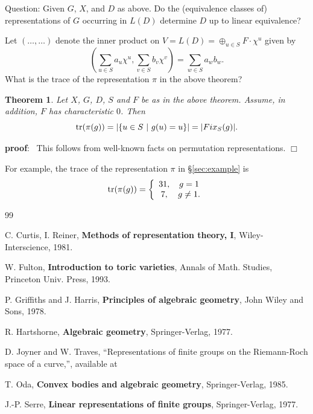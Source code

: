 \documentclass[12pt]{article}
\newtheorem{theorem}{Theorem}
\def\pf{{\bf proof}:\ }
\def\qed{$\Box$}
\begin{document}
Question: Given $G$, $X$, and $D$ as above. Do the
(equivalence classes of) representations of $G$
occurring in $L(D)$ determine $D$ up to linear equivalence?

Let $(\dots ,\dots )$ denote the inner product
on $V=L(D)=\oplus_{u\in S} F\cdot \chi^u$
given by
\[
(\sum_{u\in S}a_u\chi^u,\sum_{v\in S}b_v\chi^v)=
\sum_{w\in S}a_wb_w.
\]
What is the trace of the representation $\pi$ in 
the above theorem?

\begin{theorem}
Let $X$, $G$, $D$, $S$ and $F$ be as in the above theorem.
Assume, in addition, $F$ has characteristic $0$.
Then 
\[
{\rm tr}(\pi(g))=|\{u\in S\ |\ g(u)=u\}|=|Fix_S(g)|.
\]
\end{theorem}

\pf
This follows from well-known facts on permutation representations.
\qed

For example, the trace of the representation $\pi$ in 
\S \ref{sec:example} is 
\[
{\rm tr}(\pi(g))=
\left\{
\begin{array}{cc}
31, & g=1\\
7, & g\not= 1.
\end{array}
\right.
\]



\begin{thebibliography}{99}  

 C. Curtis, I. Reiner, {\bf Methods of 
representation theory, I}, Wiley-Interscience, 1981.
 
 W. Fulton, {\bf Introduction to toric varieties},
Annals of Math. Studies, Princeton Univ. Press, 1993.

 P. Griffiths and J. Harris, 
{\bf Principles of algebraic geometry}, John Wiley and Sons,
1978.

 R. Hartshorne, {\bf Algebraic geometry},
Springer-Verlag, 1977.

 D. Joyner and W. Traves, 
``Representations of finite groups on the Riemann-Roch
space of a curve,'', available at
\newline
\verb++

 T. Oda, {\bf Convex bodies and algebraic geometry},
Springer-Verlag, 1985.

 J.-P. Serre, {\bf Linear representations of 
finite groups}, Springer-Verlag, 1977.


\end{thebibliography}
\end{document}
